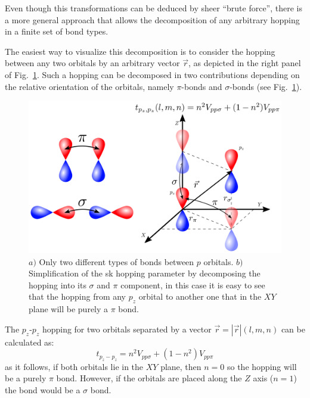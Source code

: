 Even though this transformations can be deduced by sheer ``brute force'', there is a more general approach that allows the decomposition of any arbitrary hopping in a finite set of bond types.

The easiest way to visualize this decomposition is to consider the hopping between any two orbitals by an arbitrary vector $\vec{r}$, as depicted in the right panel of Fig.~\ref{bonds}. %
Such a hopping can be decomposed in two contributions depending on the relative orientation of the orbitals, namely $\pi$-bonds and $\sigma$-bonds (see Fig.~\ref{bonds}).
\begin{figure}[h!]
\centering
\includegraphics{chapter04/figures/bonds.png}
\vspace{-5pt}
\caption{$a)$ Only two different types of bonds between $p$ orbitals. $b)$ Simplification of the \ac{sk} hopping parameter by decomposing the hopping into its $\sigma$ and $\pi$ component, in this case it is easy to see that the hopping from any $p_{z}$ orbital to another one that in the $XY$ plane will be purely a $\pi$ bond.}
\label{bonds}
\end{figure}
\FloatBarrier
The $p_z$-$p_z$ hopping for two orbitals separated by a vector $\vec{r}=|\vec{r}|(l,m,n)$ can be calculated as:
\begin{equation*}
 t_{p_z-p_z} = n^2V_{pp\sigma} + (1-n^2)V_{pp\pi}
\end{equation*}
as it follows, if both orbitals lie in the $XY$ plane, then $n=0$ so the hopping will be a purely $\pi$ bond. However, if the orbitals are placed along the $Z$ axis ($n=1$) the bond would be a $\sigma$ bond.

